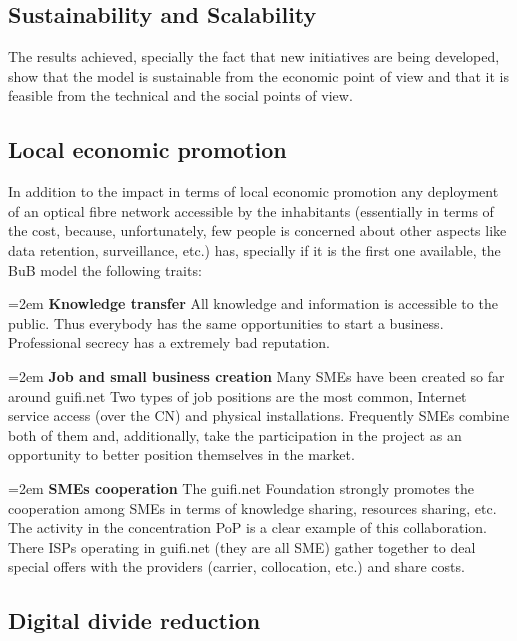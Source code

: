 \FloatBarrier
\subsection{Sustainability and Scalability}
\label{res_sustain}

The results achieved, specially the fact that new initiatives are being developed, show that the model is sustainable from the economic point of view and that it is feasible from the technical and the social points of view.


\FloatBarrier
\subsection{Local economic promotion}
\label{res_local_econ}

In addition to the impact in terms of local economic promotion any deployment of an optical fibre network accessible by the inhabitants (essentially in terms of the cost, because, unfortunately, few people is concerned about other aspects like data retention, surveillance, etc.) has, specially if it is the first one available, the BuB model the following traits:

\hangindent=2em
\textbf{Knowledge transfer}
All knowledge and information is accessible to the public. Thus everybody has the same opportunities to start a business. Professional secrecy has a extremely bad reputation.

\hangindent=2em
\textbf{Job and small business creation}
Many SMEs have been created so far around guifi.net Two types of job positions are the most common, Internet service access (over the CN) and physical installations. Frequently SMEs combine both of them and, additionally, take the participation in the project as an opportunity to better position themselves in the market.

\hangindent=2em
\textbf{SMEs cooperation}
The guifi.net Foundation strongly promotes the cooperation among SMEs in terms of knowledge sharing, resources sharing, etc. The activity in the concentration PoP is a clear example of this collaboration. There ISPs operating in guifi.net (they are all SME) gather together to deal special offers with the providers (carrier, collocation, etc.) and share costs.


\FloatBarrier
\subsection{Digital divide reduction}
\label{res_digital_div}

